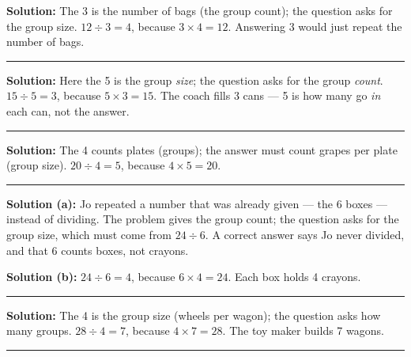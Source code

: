 \documentclass[12pt]{article}
\begin{document}



\textbf{Solution:} The 3 is the number of bags (the group count); the question asks for the group size. $12 \div 3 = 4$, because $3 \times 4 = 12$. Answering 3 would just repeat the number of bags. 

\noindent\rule{\linewidth}{0.2pt}


\textbf{Solution:} Here the 5 is the group \emph{size}; the question asks for the group \emph{count}. $15 \div 5 = 3$, because $5 \times 3 = 15$. The coach fills 3 cans --- 5 is how many go \emph{in} each can, not the answer. 

\noindent\rule{\linewidth}{0.2pt}


\textbf{Solution:} The 4 counts plates (groups); the answer must count grapes per plate (group size). $20 \div 4 = 5$, because $4 \times 5 = 20$. 

\noindent\rule{\linewidth}{0.2pt}


\textbf{Solution (a):} Jo repeated a number that was already given --- the 6 boxes --- instead of dividing. The problem gives the group count; the question asks for the group size, which must come from $24 \div 6$. A correct answer says Jo never divided, and that 6 counts boxes, not crayons.

\textbf{Solution (b):} $24 \div 6 = 4$, because $6 \times 4 = 24$. Each box holds 4 crayons. 

\noindent\rule{\linewidth}{0.2pt}


\textbf{Solution:} The 4 is the group size (wheels per wagon); the question asks how many groups. $28 \div 4 = 7$, because $4 \times 7 = 28$. The toy maker builds 7 wagons. 

\noindent\rule{\linewidth}{0.2pt}

\end{document}
